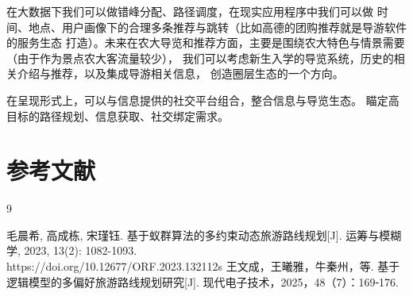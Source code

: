 \documentclass[withoutpreface,bwprint]{cumcmthesis} %
\begin{document}
在大数据下我们可以做错峰分配、路径调度，在现实应用程序中我们可以做
时间、地点、用户画像下的合理多条推荐与跳转（比如高德的团购推荐就是导游软件的服务生态
打造）。未来在农大导览和推荐方面，主要是围绕农大特色与情景需要（由于作为景点农大客流量较少），
我们可以考虑新生入学的导览系统，历史的相关介绍与推荐，以及集成导游相关信息，
创造圈层生态的一个方向。

在呈现形式上，可以与信息提供的社交平台组合，整合信息与导览生态。
瞄定高目标的路径规划、信息获取、社交绑定需求。







\section*{参考文献}

\renewcommand{\refname}{} %
\begin{thebibliography}{9}

毛晨希, 高成栋, 宋瑾钰. 基于蚁群算法的多约束动态旅游路线规划[J]. 运筹与模糊学, 2023, 13(2): 1082-1093. 
\\https://doi.org/10.12677/ORF.2023.132112s
王文成，王曦雅，牛秦州，等. 基于逻辑模型的多偏好旅游路线规划研究[J]. 现代电子技术，2025，48（7）：169⁃176.

\end{thebibliography}
\end{document}
